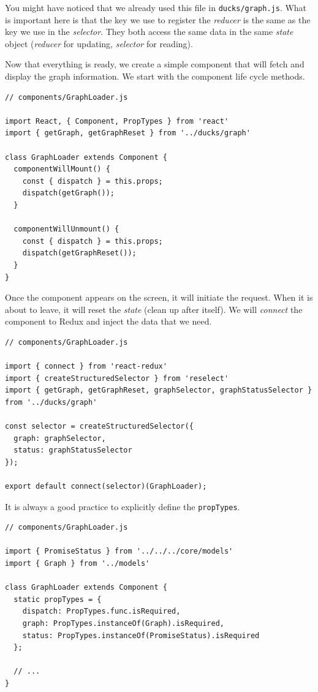 You might have noticed that we already used this file in \texttt{ducks/graph.js}. What is important here is that the key we use to register the \emph{reducer} is the same as the key we use in the \emph{selector}. They both access the same data in the same \emph{state} object (\emph{reducer} for updating, \emph{selector} for reading).

Now that everything is ready, we create a simple component that will fetch and display the graph information. We start with the component life cycle methods.

\begin{verbatim}
// components/GraphLoader.js

import React, { Component, PropTypes } from 'react'
import { getGraph, getGraphReset } from '../ducks/graph'

class GraphLoader extends Component {
  componentWillMount() {
    const { dispatch } = this.props;
    dispatch(getGraph());
  }
  
  componentWillUnmount() {
    const { dispatch } = this.props;
    dispatch(getGraphReset());
  }
}
\end{verbatim}

Once the component appears on the screen, it will initiate the request. When it is about to leave, it will reset the \emph{state} 
(clean up after itself). We will \emph{connect} the component to Redux and inject the data that we need.

\begin{verbatim}
// components/GraphLoader.js

import { connect } from 'react-redux'
import { createStructuredSelector } from 'reselect'
import { getGraph, getGraphReset, graphSelector, graphStatusSelector } from '../ducks/graph'

const selector = createStructuredSelector({
  graph: graphSelector,
  status: graphStatusSelector
});

export default connect(selector)(GraphLoader);
\end{verbatim}

It is always a good practice to explicitly define the \texttt{propTypes}.

\begin{verbatim}
// components/GraphLoader.js

import { PromiseStatus } from '../../../core/models'
import { Graph } from '../models'

class GraphLoader extends Component {
  static propTypes = {
    dispatch: PropTypes.func.isRequired,
    graph: PropTypes.instanceOf(Graph).isRequired,
    status: PropTypes.instanceOf(PromiseStatus).isRequired
  };
  
  // ...
}
\end{verbatim}

